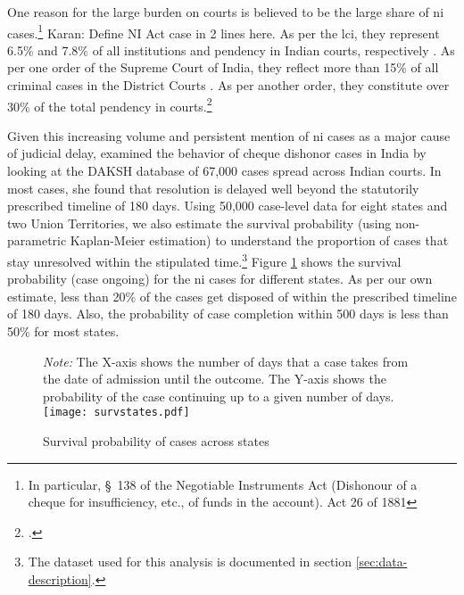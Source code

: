 \documentclass[12pt,a4paper]{article}
\begin{document}
	One reason for the large burden on courts is believed to be the large share of \gls{ni} cases.\footnote{In particular, \S~138 of the Negotiable Instruments Act (Dishonour of a cheque for insufficiency, etc., of funds in the account). Act 26 of 1881} {\color{red} Karan: Define NI Act case in 2 lines here.} As per the \gls{lci}, they represent 6.5\% and 7.8\% of all institutions and pendency in Indian courts, respectively \autocite{lci2014_arrears}. As per one order of the Supreme Court of India, they reflect more than 15\% of all criminal cases in the District Courts \autocite{sc2020_makwanavstate}. As per another order, they constitute over 30\% of the total pendency in courts.\footcite[Similarly, a study published by the Department of Justice briefly touches on the burden of such cases on the judiciary and posits that they constitute 34\% of pending criminal cases in Maharashtra.][]{sc2020_138, mahadik2018_maharashtra}
	
	Given this increasing volume and persistent mention of \gls{ni} cases as a major cause of judicial delay, \cite{sridhar2017_cheque} examined the behavior of cheque dishonor cases in India by looking at the DAKSH database of 67,000 cases spread across Indian courts. In most cases, she found that resolution is delayed well beyond the statutorily prescribed timeline of 180 days. Using 50,000 case-level data for eight states and two Union Territories, we also estimate the survival probability (using non-parametric Kaplan-Meier estimation) to understand the proportion of cases that stay unresolved within the stipulated time.\footnote{The dataset used for this analysis is documented in section \ref{sec:data-description}.} Figure \ref{fig:stateSurvival} shows the survival probability (case ongoing) for the \gls{ni} cases for different states. As per our own estimate, less than 20\% of the cases get disposed of within the prescribed timeline of 180 days. Also, the probability of case completion within 500 days is less than 50\% for most states.
	
	
	\begin{figure}[!ht]
		\centering
		\caption{Survival probability of cases across states}\label{fig:stateSurvival}
		\footnotesize
		\textit{Note:} The X-axis shows the number of days that a case takes from the date of admission until the outcome. The Y-axis shows the probability of the case continuing up to a given number of days. 
		\texttt{[image: survstates.pdf]}
	\end{figure}
		
\end{document}

